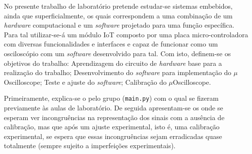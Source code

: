 
No presente trabalho de laboratório pretende estudar-se sistemas embebidos, ainda que superficialmente, os quais correspondem a uma combinação de um \textit{hardware} computacional e um \textit{software} projetado para uma função específica. Para tal utilizar-se-á um módulo IoT composto por uma placa micro-controladora com diversas funcionalidades e interfaces e capaz de funcionar como um osciloscópio com um \textit{software} desenvolvido para tal. Com isto, definem-se os objetivos do trabalho: Aprendizagem do circuito de \textit{hardware} base para a realização do trabalho; Desenvolvimento do \textit{software} para implementação do $\mu$Oscilloscope; Teste e ajuste do \textit{software}; Calibração do $\mu$Oscilloscope.

Primeiramente, explica-se o  pelo grupo (\texttt{main.py}) com o qual se fizeram  previamente às aulas de laboratório. De seguida apresentam-se os  onde se esperam ver incongruências na representação dos sinais com a ausência de calibração, mas que após um ajuste experimental, isto é, uma calibração experimental, se espera que essas incongruências sejam erradicadas quase totalmente (sempre sujeito a imperfeições experimentais).